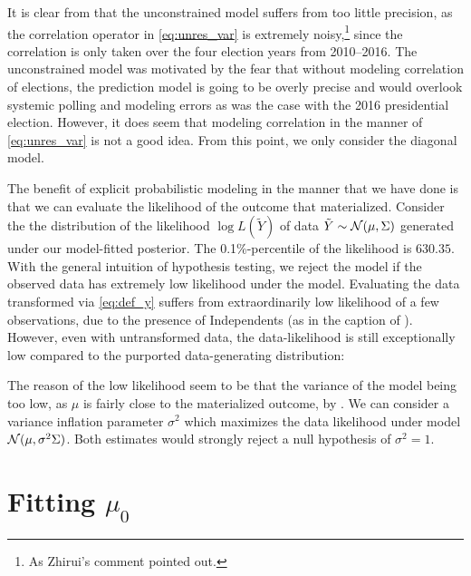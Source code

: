 \documentclass[12pt]{article}
\newcommand{\cm}{{\color{Red}{\textsf{[C]}}}}
\begin{document}
It is clear from  that the unconstrained model suffers from too little precision, as the correlation operator in \eqref{eq:unres_var} is extremely noisy,\footnote{As Zhirui's comment \cm{} pointed out.} since the correlation is only taken over the four election years from 2010--2016. The unconstrained model was motivated by the fear that without modeling correlation of elections, the prediction model is going to be overly precise and would overlook systemic polling and modeling errors as was the case with the 2016 presidential election. However, it does seem that modeling correlation in the manner of \eqref{eq:unres_var} is not a good idea. From this point, we only consider the diagonal model. 


The benefit of explicit probabilistic modeling in the manner that we have done
is that we can evaluate the likelihood of the outcome that materialized. 
Consider the the distribution of the likelihood $\log L(\tilde Y)$ of data $\tilde Y \sim \mathcal{N}(\mu, \Sigma)$ generated under our model-fitted posterior. The 0.1\%-percentile of the likelihood is $630.35$. With the general intuition of hypothesis testing, we reject the model if the observed data has extremely low likelihood under the model. Evaluating the data transformed via \eqref{eq:def_y} suffers from extraordinarily low likelihood of a few observations, due to the presence of Independents (as in the caption of ). However, even with untransformed data, the data-likelihood is still exceptionally low compared to the purported data-generating distribution:


The reason of the low likelihood seem to be that the variance of the model being too low, as $\mu$ is fairly close to the materialized outcome, by . We can consider a variance inflation parameter $\sigma^2$ which maximizes the data likelihood under model $\mathcal{N}(\mu, \sigma^2 \Sigma)$.  Both estimates would strongly reject a null hypothesis of $\sigma^2 =1$.

\section{Fitting $\mu_0$}
\label{sec:mu}
\end{document}
